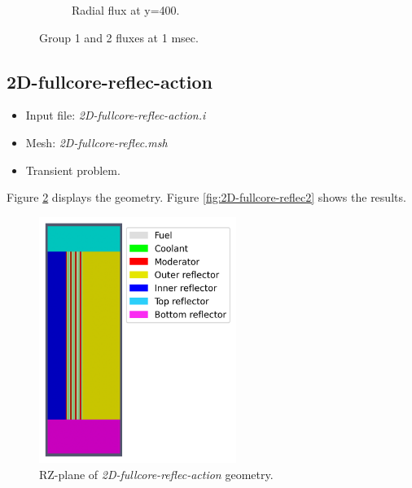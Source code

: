\documentclass[11pt,letterpaper]{article}
\begin{document}
\begin{figure}[htbp!]
\begin{subfigure}[t]{0.4\textwidth}
			\caption{Radial flux at y=400.}
		\end{subfigure}
		\hfill
		\caption{Group 1 and 2 fluxes at 1 msec.}
		\label{fig:2D-fullcore-reflecB2}
	\end{figure}

\subsection{2D-fullcore-reflec-action}

	\begin{itemize}
		\item Input file: \textit{2D-fullcore-reflec-action.i}
		\item Mesh: \textit{2D-fullcore-reflec.msh}
		\item Transient problem.
	\end{itemize}

Figure \ref{fig:2D-fullcore-reflec} displays the geometry.
Figure \ref{fig:2D-fullcore-reflec2} shows the results.

	\begin{figure}[htbp!]
		\centering
		\includegraphics[height=8cm]{2D-fullcore-reflec-meshB}
		\caption{RZ-plane of \textit{2D-fullcore-reflec-action} geometry.}
		\label{fig:2D-fullcore-reflec}
	\end{figure}
\end{document}
